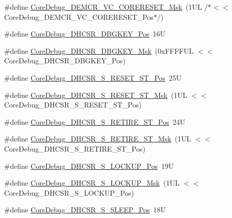 \begin{DoxyCompactItemize}
\item 
\#define \hyperlink{group___c_m_s_i_s___core_debug_ga906476e53c1e1487c30f3a1181df9e30}{Core\-Debug\-\_\-\-D\-E\-M\-C\-R\-\_\-\-V\-C\-\_\-\-C\-O\-R\-E\-R\-E\-S\-E\-T\-\_\-\-Msk}~(1\-U\-L /$\ast$$<$$<$ Core\-Debug\-\_\-\-D\-E\-M\-C\-R\-\_\-\-V\-C\-\_\-\-C\-O\-R\-E\-R\-E\-S\-E\-T\-\_\-\-Pos$\ast$/)
\item 
\#define \hyperlink{group___c_m_s_i_s___core_debug_gac91280edd0ce932665cf75a23d11d842}{Core\-Debug\-\_\-\-D\-H\-C\-S\-R\-\_\-\-D\-B\-G\-K\-E\-Y\-\_\-\-Pos}~16\-U
\item 
\#define \hyperlink{group___c_m_s_i_s___core_debug_ga1ce997cee15edaafe4aed77751816ffc}{Core\-Debug\-\_\-\-D\-H\-C\-S\-R\-\_\-\-D\-B\-G\-K\-E\-Y\-\_\-\-Msk}~(0x\-F\-F\-F\-F\-U\-L $<$$<$ Core\-Debug\-\_\-\-D\-H\-C\-S\-R\-\_\-\-D\-B\-G\-K\-E\-Y\-\_\-\-Pos)
\item 
\#define \hyperlink{group___c_m_s_i_s___core_debug_ga6f934c5427ea057394268e541fa97753}{Core\-Debug\-\_\-\-D\-H\-C\-S\-R\-\_\-\-S\-\_\-\-R\-E\-S\-E\-T\-\_\-\-S\-T\-\_\-\-Pos}~25\-U
\item 
\#define \hyperlink{group___c_m_s_i_s___core_debug_gac474394bcceb31a8e09566c90b3f8922}{Core\-Debug\-\_\-\-D\-H\-C\-S\-R\-\_\-\-S\-\_\-\-R\-E\-S\-E\-T\-\_\-\-S\-T\-\_\-\-Msk}~(1\-U\-L $<$$<$ Core\-Debug\-\_\-\-D\-H\-C\-S\-R\-\_\-\-S\-\_\-\-R\-E\-S\-E\-T\-\_\-\-S\-T\-\_\-\-Pos)
\item 
\#define \hyperlink{group___c_m_s_i_s___core_debug_ga2328118f8b3574c871a53605eb17e730}{Core\-Debug\-\_\-\-D\-H\-C\-S\-R\-\_\-\-S\-\_\-\-R\-E\-T\-I\-R\-E\-\_\-\-S\-T\-\_\-\-Pos}~24\-U
\item 
\#define \hyperlink{group___c_m_s_i_s___core_debug_ga89dceb5325f6bcb36a0473d65fbfcfa6}{Core\-Debug\-\_\-\-D\-H\-C\-S\-R\-\_\-\-S\-\_\-\-R\-E\-T\-I\-R\-E\-\_\-\-S\-T\-\_\-\-Msk}~(1\-U\-L $<$$<$ Core\-Debug\-\_\-\-D\-H\-C\-S\-R\-\_\-\-S\-\_\-\-R\-E\-T\-I\-R\-E\-\_\-\-S\-T\-\_\-\-Pos)
\item 
\#define \hyperlink{group___c_m_s_i_s___core_debug_ga2900dd56a988a4ed27ad664d5642807e}{Core\-Debug\-\_\-\-D\-H\-C\-S\-R\-\_\-\-S\-\_\-\-L\-O\-C\-K\-U\-P\-\_\-\-Pos}~19\-U
\item 
\#define \hyperlink{group___c_m_s_i_s___core_debug_ga7b67e4506d7f464ef5dafd6219739756}{Core\-Debug\-\_\-\-D\-H\-C\-S\-R\-\_\-\-S\-\_\-\-L\-O\-C\-K\-U\-P\-\_\-\-Msk}~(1\-U\-L $<$$<$ Core\-Debug\-\_\-\-D\-H\-C\-S\-R\-\_\-\-S\-\_\-\-L\-O\-C\-K\-U\-P\-\_\-\-Pos)
\item 
\#define \hyperlink{group___c_m_s_i_s___core_debug_ga349ccea33accc705595624c2d334fbcb}{Core\-Debug\-\_\-\-D\-H\-C\-S\-R\-\_\-\-S\-\_\-\-S\-L\-E\-E\-P\-\_\-\-Pos}~18\-U

\end{DoxyCompactItemize}
